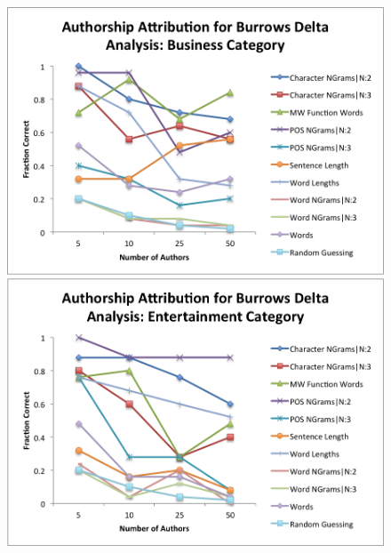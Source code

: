 \documentclass[pageno]{jpaper}
\begin{document}
\begin{figure}[h!]
\begin{center}
\includegraphics*[scale=.75]{BDBusiness}
\includegraphics*[scale=.75]{BDEntertainment}
\end{center}
\label{fig:BDCategories1}
\end{figure}
\end{document}
